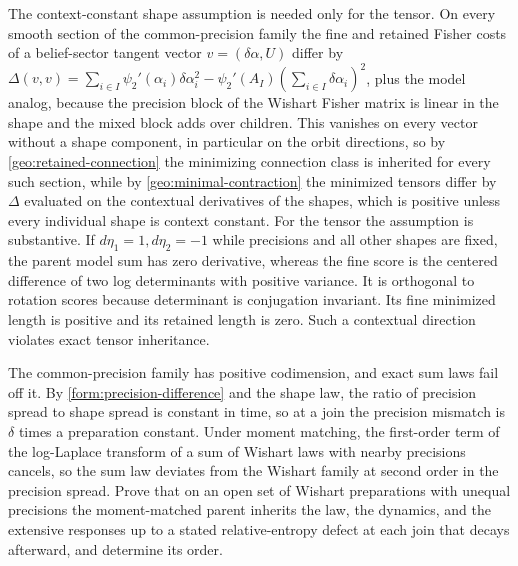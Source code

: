 The context-constant shape assumption is needed only for the tensor. On every smooth section of the common-precision family the fine and retained Fisher costs of a belief-sector tangent vector $v=(\delta\alpha,U)$ differ by $\Delta(v,v)=\sum_{i\in I}\psi_2'(\alpha_i)\delta\alpha_i^2-\psi_2'(A_I)(\sum_{i\in I}\delta\alpha_i)^2$, plus the model analog, because the precision block of the Wishart Fisher matrix is linear in the shape and the mixed block adds over children. This vanishes on every vector without a shape component, in particular on the orbit directions, so by \cref{geo:retained-connection} the minimizing connection class is inherited for every such section, while by \cref{geo:minimal-contraction} the minimized tensors differ by $\Delta$ evaluated on the contextual derivatives of the shapes, which is positive unless every individual shape is context constant. For the tensor the assumption is substantive. If
$d\eta_1=1,d\eta_2=-1$ while precisions and all other shapes are fixed,
the parent model sum has zero derivative, whereas the fine score is the
centered difference of two log determinants with positive variance.
It is orthogonal to rotation scores because determinant is conjugation
invariant. Its fine minimized length is positive and its retained length
is zero. Such a contextual direction violates exact tensor inheritance.

The common-precision family has positive codimension, and exact sum laws fail off it. By \cref{form:precision-difference} and the shape law, the ratio of precision spread to shape spread is constant in time, so at a join the precision mismatch is $\delta$ times a preparation constant. Under moment matching, the first-order term of the log-Laplace transform of a sum of Wishart laws with nearby precisions cancels, so the sum law deviates from the Wishart family at second order in the precision spread. Prove that on an open set of Wishart preparations with unequal precisions the moment-matched parent inherits the law, the dynamics, and the extensive responses up to a stated relative-entropy defect at each join that decays afterward, and determine its order.
